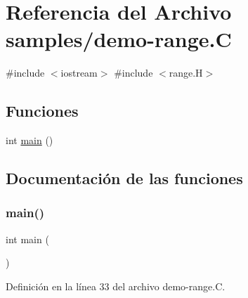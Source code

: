 \hypertarget{demo-range_8_c}{}\section{Referencia del Archivo samples/demo-\/range.C}
\label{demo-range_8_c}
{\ttfamily \#include $<$iostream$>$}\newline
{\ttfamily \#include $<$range.\+H$>$}\newline
\subsection*{Funciones}
\begin{DoxyCompactItemize}
\item 
int \hyperlink{demo-range_8_c_ae66f6b31b5ad750f1fe042a706a4e3d4}{main} ()
\end{DoxyCompactItemize}


\subsection{Documentación de las funciones}
\mbox{\label{demo-range_8_c_ae66f6b31b5ad750f1fe042a706a4e3d4}} 
\subsubsection{\texorpdfstring{main()}{main()}}
{\footnotesize\ttfamily int main (\begin{DoxyParamCaption}{ }\end{DoxyParamCaption})}



Definición en la línea 33 del archivo demo-\/range.\+C.

